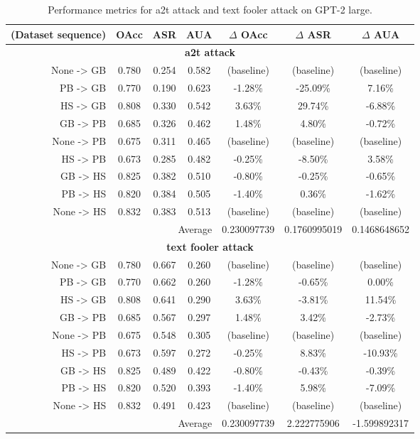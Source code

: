 \documentclass{article}
\begin{document}
\begin{table}[ht]
\centering
\caption{Performance metrics for a2t attack and text fooler attack on GPT-2 large.}
\small
\begin{tabular}{r|ccc|ccc}
\hline
\textbf{(Dataset sequence)} & \textbf{OAcc} & \textbf{ASR} & \textbf{AUA} & \textbf{$\Delta$ OAcc} & \textbf{$\Delta$ ASR} & \textbf{$\Delta$ AUA} \\ \hline
\multicolumn{7}{c}{\textbf{a2t attack}} \\ \hline
None -> GB & 0.780 & 0.254 & 0.582 & (baseline) & (baseline) & (baseline) \\
PB -> GB & 0.770 & 0.190 & 0.623 & -1.28\% & -25.09\% & 7.16\% \\
HS -> GB & 0.808 & 0.330 & 0.542 & 3.63\% & 29.74\% & -6.88\% \\
GB -> PB & 0.685 & 0.326 & 0.462 & 1.48\% & 4.80\% & -0.72\% \\
None -> PB & 0.675 & 0.311 & 0.465 & (baseline) & (baseline) & (baseline) \\
HS -> PB & 0.673 & 0.285 & 0.482 & -0.25\% & -8.50\% & 3.58\% \\
GB -> HS & 0.825 & 0.382 & 0.510 & -0.80\% & -0.25\% & -0.65\% \\
PB -> HS & 0.820 & 0.384 & 0.505 & -1.40\% & 0.36\% & -1.62\% \\
None -> HS & 0.832 & 0.383 & 0.513 & (baseline) & (baseline) & (baseline) \\ \hline
\multicolumn{4}{r|}{Average} & 0.230097739 & 0.1760995019 & 0.1468648652 \\ \hline
\multicolumn{7}{c}{\textbf{text fooler attack}} \\ \hline
None -> GB & 0.780 & 0.667 & 0.260 & (baseline) & (baseline) & (baseline) \\
PB -> GB & 0.770 & 0.662 & 0.260 & -1.28\% & -0.65\% & 0.00\% \\
HS -> GB & 0.808 & 0.641 & 0.290 & 3.63\% & -3.81\% & 11.54\% \\
GB -> PB & 0.685 & 0.567 & 0.297 & 1.48\% & 3.42\% & -2.73\% \\
None -> PB & 0.675 & 0.548 & 0.305 & (baseline) & (baseline) & (baseline) \\
HS -> PB & 0.673 & 0.597 & 0.272 & -0.25\% & 8.83\% & -10.93\% \\
GB -> HS & 0.825 & 0.489 & 0.422 & -0.80\% & -0.43\% & -0.39\% \\
PB -> HS & 0.820 & 0.520 & 0.393 & -1.40\% & 5.98\% & -7.09\% \\
None -> HS & 0.832 & 0.491 & 0.423 & (baseline) & (baseline) & (baseline) \\ \hline
\multicolumn{4}{r|}{Average} & 0.230097739 & 2.222775906 & -1.599892317 \\ \hline
\end{tabular}
\label{table:gpt2_large_attack_comparison}
\end{table}
\end{document}
